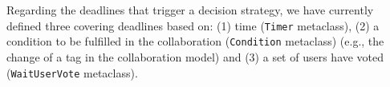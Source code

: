 Regarding the deadlines that trigger a decision strategy, we have currently defined three covering deadlines based on: (1) time (\texttt{Timer} metaclass), (2) a condition to be fulfilled in the collaboration (\texttt{Condition} metaclass) (e.g., the change of a tag in the collaboration model) and (3) a set of users have voted (\texttt{WaitUserVote} metaclass).
 
